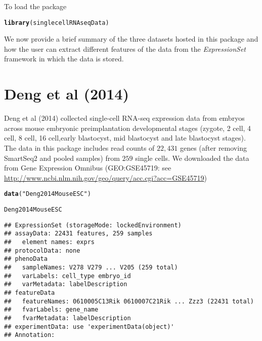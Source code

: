 \documentclass[12pt]{article}\usepackage[]{graphicx}\usepackage[usenames,dvipsnames]{color}
\makeatletter
\newcommand{\hlstr}[1]{\textcolor[rgb]{0.192,0.494,0.8}{#1}}%
\newcommand{\hlstd}[1]{\textcolor[rgb]{0.345,0.345,0.345}{#1}}%
\newcommand{\hlkwd}[1]{\textcolor[rgb]{0.737,0.353,0.396}{\textbf{#1}}}%
\newenvironment{kframe}{%
 \def\at@end@of@kframe{}%
 \ifinner\ifhmode%
  \def\at@end@of@kframe{\end{minipage}}%
  \begin{minipage}{\columnwidth}%
 \fi\fi%
 \def\FrameCommand##1{\hskip\@totalleftmargin \hskip-\fboxsep
 \colorbox{shadecolor}{##1}\hskip-\fboxsep
     \hskip-\linewidth \hskip-\@totalleftmargin \hskip\columnwidth}%
 \MakeFramed {\advance\hsize-\width
   \@totalleftmargin\z@ \linewidth\hsize
   \@setminipage}}%
 {\par\unskip\endMakeFramed%
 \at@end@of@kframe}
\newenvironment{knitrout}{}{} %
\makeatother
\begin{document}
To load the package

\begin{knitrout}
\color{fgcolor}\begin{kframe}
\begin{alltt}
\hlkwd{library}\hlstd{(singlecellRNAseqData)}
\end{alltt}
\end{kframe}
\end{knitrout}

We now provide a brief summary of the three datasets hosted in this package and
how the user can extract different features of the data from the
\textit{ExpressionSet} framework in which the data is stored.

\section{Deng et al (2014)}

Deng et al (2014) \cite{Deng2014} collected single-cell RNA-seq expression data from embryos across mouse embryonic preimplantation developmental stages (zygote, 2 cell,
4 cell, 8 cell, 16 cell,early blastocyst, mid blastocyst and late blastocyst
stages). The data in this package includes read counts of $22,431$ genes (after removing SmartSeq2 and pooled samples) from $259$ single cells. We downloaded the data from Gene Expression Omnibus
(GEO:GSE45719: see \url{http://www.ncbi.nlm.nih.gov/geo/query/acc.cgi?acc=GSE45719})

\begin{knitrout}
\color{fgcolor}\begin{kframe}
\begin{alltt}
\hlkwd{data}\hlstd{(}\hlstr{"Deng2014MouseESC"}\hlstd{)}
\end{alltt}


{\ttfamily\noindent{}}\begin{alltt}
\hlstd{Deng2014MouseESC}
\end{alltt}
\begin{verbatim}
## ExpressionSet (storageMode: lockedEnvironment)
## assayData: 22431 features, 259 samples 
##   element names: exprs 
## protocolData: none
## phenoData
##   sampleNames: V278 V279 ... V205 (259 total)
##   varLabels: cell_type embryo_id
##   varMetadata: labelDescription
## featureData
##   featureNames: 0610005C13Rik 0610007C21Rik ... Zzz3 (22431 total)
##   fvarLabels: gene_name
##   fvarMetadata: labelDescription
## experimentData: use 'experimentData(object)'
## Annotation:
\end{verbatim}
\end{kframe}
\end{knitrout}
\end{document}
